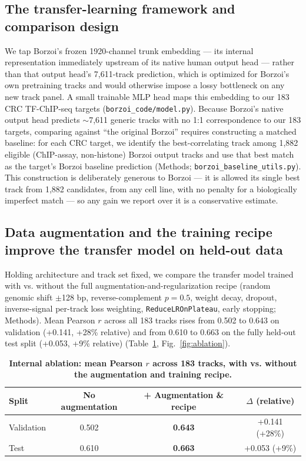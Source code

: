 \documentclass[10pt]{article}
\begin{document}
\subsection*{The transfer-learning framework and comparison design}
We tap Borzoi's frozen 1920-channel trunk embedding --- its internal representation immediately upstream of its native human output head --- rather than that output head's 7,611-track prediction, which is optimized for Borzoi's own pretraining tracks and would otherwise impose a lossy bottleneck on any new track panel. A small trainable MLP head maps this embedding to our 183 CRC TF-ChIP-seq targets (\texttt{borzoi\_code/model.py}). Because Borzoi's native output head predicts $\sim$7,611 generic tracks with no 1:1 correspondence to our 183 targets, comparing against ``the original Borzoi'' requires constructing a matched baseline: for each CRC target, we identify the best-correlating track among 1,882 eligible (ChIP-assay, non-histone) Borzoi output tracks and use that best match as the target's Borzoi baseline prediction (Methods; \texttt{borzoi\_baseline\_utils.py}). This construction is deliberately generous to Borzoi --- it is allowed its single best track from 1,882 candidates, from any cell line, with no penalty for a biologically imperfect match --- so any gain we report over it is a conservative estimate.

\subsection*{Data augmentation and the training recipe improve the transfer model on held-out data}
Holding architecture and track set fixed, we compare the transfer model trained with vs. without the full augmentation-and-regularization recipe (random genomic shift $\pm$128 bp, reverse-complement $p = 0.5$, weight decay, dropout, inverse-signal per-track loss weighting, \texttt{ReduceLROnPlateau}, early stopping; Methods). Mean Pearson $r$ across all 183 tracks rises from 0.502 to 0.643 on validation (+0.141, +28\% relative) and from 0.610 to 0.663 on the fully held-out test split (+0.053, +9\% relative) (Table~\ref{tab:ablation}, Fig.~\ref{fig:ablation}).

\begin{table}[H]
\centering
\caption{\textbf{Internal ablation: mean Pearson $r$ across 183 tracks, with vs. without the augmentation and training recipe.}}
\label{tab:ablation}
\begin{tabular}{lccc}
\toprule
Split & No augmentation & + Augmentation \& recipe & $\Delta$ (relative) \\
\midrule
Validation & 0.502 & \textbf{0.643} & +0.141 (+28\%) \\
Test       & 0.610 & \textbf{0.663} & +0.053 (+9\%) \\
\bottomrule
\end{tabular}
\end{table}
\end{document}
